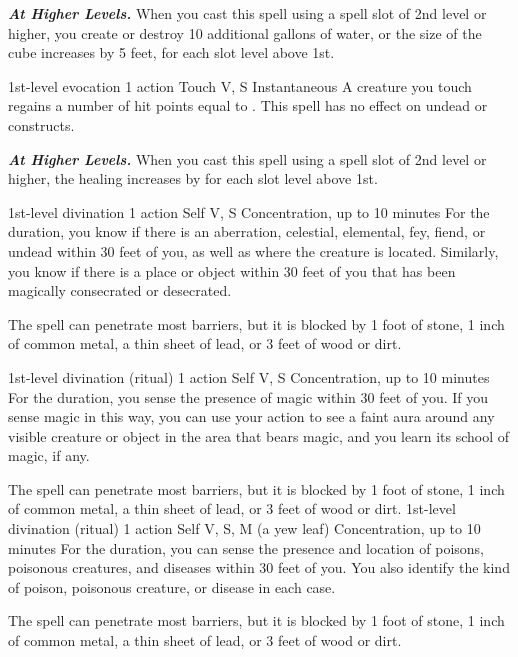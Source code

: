 \documentclass[10pt,twoside,twocolumn,openany]{book}
\newcommand{\castingModifier}{3}
\newcommand\impact[1]{
	\textbf{\textit{#1}}
}
\begin{document}
\impact{At Higher Levels.} When you cast this spell using a spell slot of 2nd level or higher, you create or destroy 10 additional gallons of water, or the size of the cube increases by 5 feet, for each slot level above 1st.

\newpage
{}
{1st-level evocation}
{\color{action} 1 action}
{Touch}
{V, S}
{Instantaneous}
%
A creature you touch regains a number of hit points equal to \dice{1d8 + \castingModifier}. This spell has no effect on undead or constructs.

\impact{At Higher Levels.} When you cast this spell using a spell slot of 2nd level or higher, the healing increases by
 for each slot level above 1st.

{1st-level divination}
{\color{action} 1 action}
{Self}
{V, S}
{{\color{concentration}Concentration}, up to 10 minutes}
%
For the duration, you know if there is an aberration, celestial, elemental, fey, fiend, or undead within 30 feet of you, as well as where the creature is located. Similarly, you know if there is a place or object within 30 feet of you that has been magically consecrated or desecrated.

The spell can penetrate most barriers, but it is blocked by 1 foot of stone, 1 inch of common metal, a thin sheet of lead, or 3 feet of wood or dirt.

{1st-level divination {\color{ritual}(ritual)}}
{\color{action} 1 action}
{Self}
{V, S}
{{\color{concentration}Concentration}, up to 10 minutes}
%
For the duration, you sense the presence of magic
within 30 feet of you. If you sense magic in this way, you can use your action to see a faint aura around any visible creature or object in the area that bears magic, and you learn its school of magic, if any.

The spell can penetrate most barriers, but it is blocked by 1 foot of stone, 1 inch of common metal, a thin sheet of lead, or 3 feet of wood or dirt.
{1st-level divination {\color{ritual}(ritual)}}
{\color{action} 1 action}
{Self}
{V, S, M (a yew leaf)}
{{\color{concentration}Concentration}, up to 10 minutes}
%
For the duration, you can sense the presence and location of poisons, poisonous creatures, and diseases within 30 feet of you. You also identify the kind of poison, poisonous creature, or disease in each case.

The spell can penetrate most barriers, but it is blocked by 1 foot of stone, 1 inch of common metal, a thin sheet of lead, or 3 feet of wood or dirt.
\end{document}

